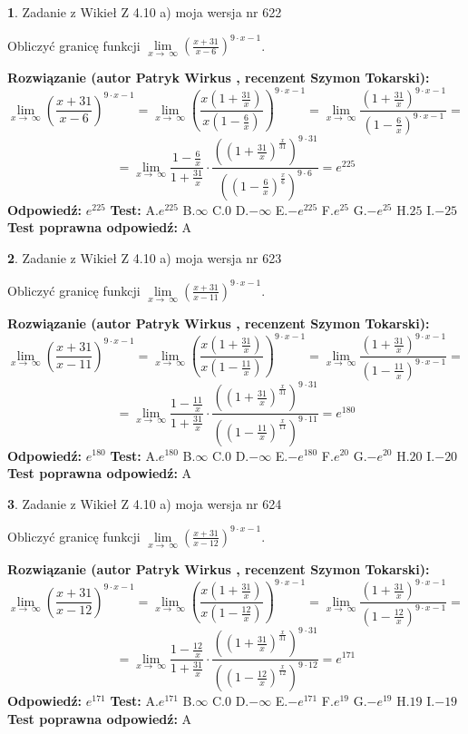 \documentclass[12pt, a4paper]{article}
\theoremstyle{definition} %
\newtheorem{zad}{}
\newcommand{\zadStart}[1]{\begin{zad}#1\newline}
\newcommand{\zadStop}{\end{zad}}
\newcommand{\rozwStart}[2]{\noindent \textbf{Rozwiązanie (autor #1 , recenzent #2): }\newline}
\newcommand{\rozwStop}{\newline}
\newcommand{\odpStart}{\noindent \textbf{Odpowiedź:}\newline}
\newcommand{\odpStop}{\newline}
\newcommand{\testStart}{\noindent \textbf{Test:}\newline}
\newcommand{\testStop}{\newline}
\newcommand{\kluczStart}{\noindent \textbf{Test poprawna odpowiedź:}\newline}
\newcommand{\kluczStop}{\newline}
\begin{document}
\zadStart{Zadanie z Wikieł Z 4.10 a) moja wersja nr 622}

Obliczyć granicę funkcji  $\lim\limits_{x\to\ \infty}(\frac{x+31}{x-6})^{9\cdot x-1}$.
\zadStop
\rozwStart{Patryk Wirkus}{Szymon Tokarski}
$$\lim\limits_{x\to\ \infty}(\frac{x+31}{x-6})^{9\cdot x-1} = \lim\limits_{x\to\ \infty}(\frac{x(1+\frac{31}{x})}{x(1-\frac{6}{x})})^{9\cdot x-1}=\lim\limits_{x\to\ \infty}\frac{(1+\frac{31}{x})^{9\cdot x-1}}{(1-\frac{6}{x})^{9\cdot x-1}}=$$
$$=\lim\limits_{x\to\ \infty}\frac{1-\frac{6}{x}}{1+\frac{31}{x}}\cdot\frac{((1+\frac{31}{x})^{\frac{x}{31}})^{9\cdot31}}{((1-\frac{6}{x})^{\frac{x}{6}})^{9\cdot6}}=e^{225}$$
\rozwStop
\odpStart
$e^{225}$
\odpStop
\testStart
A.$e^{225}$ B.$\infty$ C.$0$ D.$-\infty$ E.$-e^{225}$
F.$e^{25}$ G.$-e^{25}$
H.$25$
I.$-25$
\testStop
\kluczStart
A
\kluczStop



\zadStart{Zadanie z Wikieł Z 4.10 a) moja wersja nr 623}

Obliczyć granicę funkcji  $\lim\limits_{x\to\ \infty}(\frac{x+31}{x-11})^{9\cdot x-1}$.
\zadStop
\rozwStart{Patryk Wirkus}{Szymon Tokarski}
$$\lim\limits_{x\to\ \infty}(\frac{x+31}{x-11})^{9\cdot x-1} = \lim\limits_{x\to\ \infty}(\frac{x(1+\frac{31}{x})}{x(1-\frac{11}{x})})^{9\cdot x-1}=\lim\limits_{x\to\ \infty}\frac{(1+\frac{31}{x})^{9\cdot x-1}}{(1-\frac{11}{x})^{9\cdot x-1}}=$$
$$=\lim\limits_{x\to\ \infty}\frac{1-\frac{11}{x}}{1+\frac{31}{x}}\cdot\frac{((1+\frac{31}{x})^{\frac{x}{31}})^{9\cdot31}}{((1-\frac{11}{x})^{\frac{x}{11}})^{9\cdot11}}=e^{180}$$
\rozwStop
\odpStart
$e^{180}$
\odpStop
\testStart
A.$e^{180}$ B.$\infty$ C.$0$ D.$-\infty$ E.$-e^{180}$
F.$e^{20}$ G.$-e^{20}$
H.$20$
I.$-20$
\testStop
\kluczStart
A
\kluczStop



\zadStart{Zadanie z Wikieł Z 4.10 a) moja wersja nr 624}

Obliczyć granicę funkcji  $\lim\limits_{x\to\ \infty}(\frac{x+31}{x-12})^{9\cdot x-1}$.
\zadStop
\rozwStart{Patryk Wirkus}{Szymon Tokarski}
$$\lim\limits_{x\to\ \infty}(\frac{x+31}{x-12})^{9\cdot x-1} = \lim\limits_{x\to\ \infty}(\frac{x(1+\frac{31}{x})}{x(1-\frac{12}{x})})^{9\cdot x-1}=\lim\limits_{x\to\ \infty}\frac{(1+\frac{31}{x})^{9\cdot x-1}}{(1-\frac{12}{x})^{9\cdot x-1}}=$$
$$=\lim\limits_{x\to\ \infty}\frac{1-\frac{12}{x}}{1+\frac{31}{x}}\cdot\frac{((1+\frac{31}{x})^{\frac{x}{31}})^{9\cdot31}}{((1-\frac{12}{x})^{\frac{x}{12}})^{9\cdot12}}=e^{171}$$
\rozwStop
\odpStart
$e^{171}$
\odpStop
\testStart
A.$e^{171}$ B.$\infty$ C.$0$ D.$-\infty$ E.$-e^{171}$
F.$e^{19}$ G.$-e^{19}$
H.$19$
I.$-19$
\testStop
\kluczStart
A
\kluczStop
\end{document}
